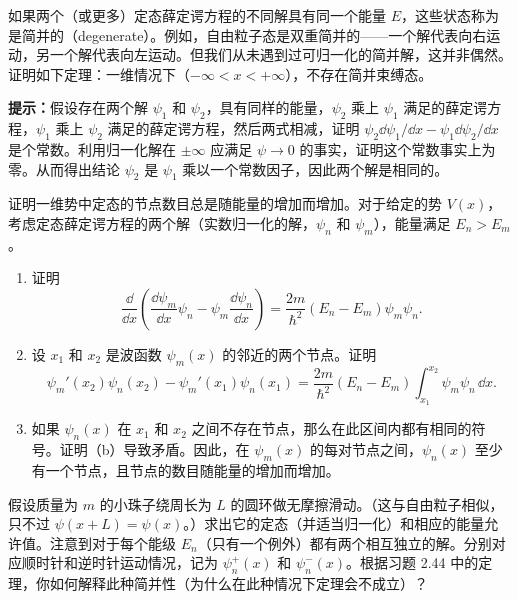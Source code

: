 如果两个（或更多）定态薛定谔方程的不同解具有同一个能量 $E$，这些状态称为是简并的（degenerate）。例如，自由粒子态是双重简并的——一个解代表向右运动，另一个解代表向左运动。但我们从未遇到过可归一化的简并解，这并非偶然。证明如下定理：一维情况下（$-\infty<x<+\infty$），不存在简并束缚态。

\textbf{提示：}假设存在两个解 $\psi_1$ 和 $\psi_2$，具有同样的能量，$\psi_2$ 乘上 $\psi_1$ 满足的薛定谔方程，$\psi_1$ 乘上 $\psi_2$ 满足的薛定谔方程，然后两式相减，证明 $\psi_2\dd\psi_1/\dd x-\psi_1\dd\psi_2/\dd x$ 是个常数。利用归一化解在 $\pm\infty$ 应满足 $\psi\to0$ 的事实，证明这个常数事实上为零。从而得出结论 $\psi_2$ 是 $\psi_1$ 乘以一个常数因子，因此两个解是相同的。
\vfill

证明一维势中定态的节点数目总是随能量的增加而增加。对于给定的势 $V(x)$，考虑定态薛定谔方程的两个解（实数归一化的解，$\psi_n$ 和 $\psi_m$），能量满足 $E_n>E_m$。
\begin{enumerate}
\item 证明
\[
\frac{\dd}{\dd x}\left(\frac{\dd\psi_m}{\dd x}\psi_n-\psi_m\frac{\dd\psi_n}{\dd x}\right)
=\frac{2m}{\hbar^2}(E_n-E_m)\psi_m\psi_n.
\]
\item 设 $x_1$ 和 $x_2$ 是波函数 $\psi_m(x)$ 的邻近的两个节点。证明
\[
\psi_m'(x_2)\psi_n(x_2)-\psi_m'(x_1)\psi_n(x_1)
=\frac{2m}{\hbar^2}(E_n-E_m)\int_{x_1}^{x_2}\psi_m\psi_n\,\dd x.
\]
\item 如果 $\psi_n(x)$ 在 $x_1$ 和 $x_2$ 之间不存在节点，那么在此区间内都有相同的符号。证明（b）导致矛盾。因此，在 $\psi_m(x)$ 的每对节点之间，$\psi_n(x)$ 至少有一个节点，且节点的数目随能量的增加而增加。
\end{enumerate}
\vfill

假设质量为 $m$ 的小珠子绕周长为 $L$ 的圆环做无摩擦滑动。（这与自由粒子相似，只不过 $\psi(x+L)=\psi(x)$。）求出它的定态（并适当归一化）和相应的能量允许值。注意到对于每个能级 $E_n$（只有一个例外）都有两个相互独立的解。分别对应顺时针和逆时针运动情况，记为 $\psi_n^+(x)$ 和 $\psi_n^-(x)$。根据习题 2.44 中的定理，你如何解释此种简并性（为什么在此种情况下定理会不成立）？
\vfill

